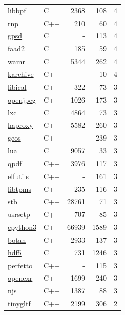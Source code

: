 \begin{table}[p]
\begin{minipage}[t]{.32\textwidth}
{\begin{tabular}[t]{@{}llrrr@{}}
\href{https://github.com/libbpf/libbpf}{libbpf} & C & 2368 & 108 & 4 \\
\href{https://www.rnpgp.com/}{rnp} & C++ & 210 & 60 & 4 \\
\href{https://gpsd.io}{gpsd} & C & - & 113 & 4 \\
\href{https://sourceforge.net/projects/faac}{faad2} & C & 185 & 59 & 4 \\
\href{https://github.com/bytecodealliance/wasm-micro-runtime}{wamr} & C & 5344 & 262 & 4 \\
\href{https://cgit.kde.org/karchive.git/}{karchive} & C++ & - & 10 & 4 \\
\href{https://github.com/libical/libical}{libical} & C++ & 322 & 73 & 3 \\
\href{http://www.openjpeg.org/}{openjpeg} & C++ & 1026 & 173 & 3 \\
\href{https://github.com/lxc/lxc}{lxc} & C & 4864 & 73 & 3 \\
\href{https://github.com/haproxy/haproxy}{haproxy} & C++ & 5582 & 260 & 3 \\
\href{https://geos.osgeo.org}{geos} & C++ & - & 239 & 3 \\
\href{https://www.lua.org/}{lua} & C & 9057 & 33 & 3 \\
\href{http://qpdf.sourceforge.net/}{qpdf} & C++ & 3976 & 117 & 3 \\
\href{https://sourceware.org/elfutils/}{elfutils} & C++ & - & 161 & 3 \\
\href{https://github.com/stefanberger/libtpms}{libtpms} & C++ & 235 & 116 & 3 \\
\href{https://github.com/nothings/stb}{stb} & C++ & 28761 & 71 & 3 \\
\href{https://github.com/sctplab/usrsctp}{usrsctp} & C++ & 707 & 85 & 3 \\
\href{https://python.org/}{cpython3} & C++ & 66939 & 1589 & 3 \\
\href{https://botan.randombit.net}{botan} & C++ & 2933 & 137 & 3 \\
\href{https://www.hdfgroup.org/solutions/hdf5/}{hdf5} & C & 731 & 1246 & 3 \\
\href{https://perfetto.dev}{perfetto} & C++ & - & 115 & 3 \\
\href{https://openexr.com}{openexr} & C++ & 1699 & 240 & 3 \\
\href{https://nginx.org/en/docs/njs/}{njs} & C++ & 1387 & 88 & 3 \\
\href{https://github.com/syoyo/tinygltf}{tinygltf} & C++ & 2199 & 306 & 2 \\

\end{tabular}}
\end{minipage}
\end{table}

